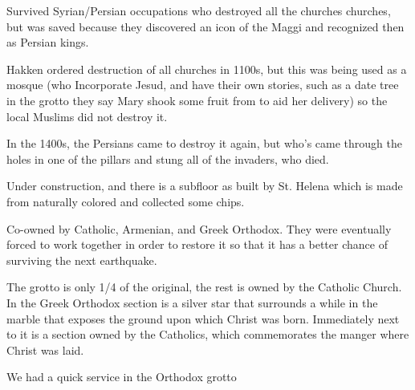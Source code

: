 \documentclass[letterpaper]{report}
\begin{document}
Survived Syrian/Persian occupations who destroyed all the churches churches, but was saved because they discovered an icon of the Maggi and recognized then as Persian kings.

Hakken ordered destruction of all churches in 1100s, but this was being used as a mosque (who Incorporate Jesud, and have their own stories, such as a date tree in the grotto they say Mary shook some fruit from to aid her delivery) so the local Muslims did not destroy it.

In the 1400s, the Persians came to destroy it again, but who's came through the holes in one of the pillars and stung all of the invaders, who died.

Under construction, and there is a subfloor as built by St. Helena which is made from naturally colored and collected some chips.

Co-owned by Catholic, Armenian, and Greek Orthodox. They were eventually forced to work together in order to restore it so that it has a better chance of surviving the next earthquake.

The grotto is only 1/4 of the original, the rest is owned by the Catholic Church.
In the Greek Orthodox section is a silver star that surrounds a while in the marble that exposes the ground upon which Christ was born. Immediately next to it is a section owned by the Catholics, which commemorates the manger where Christ was laid.

We had a quick service in the Orthodox grotto
\end{document}
